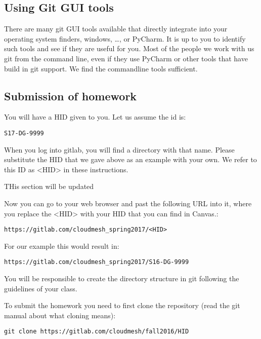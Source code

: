\subsection{Using Git GUI tools}\label{using-git-gui-tools}

There are many git GUI tools available that directly integrate into your
operating system finders, windows, \ldots{}, or PyCharm. It is up to you
to identify such tools and see if they are useful for you. Most of the
people we work with us git from the command line, even if they use
PyCharm or other tools that have build in git support. We find the
commandline tools sufficient.

\subsection{Submission of homework}\label{submission-of-homework}

You will have a HID given to you. Let us assume the id is:

\begin{verbatim}
S17-DG-9999
\end{verbatim}

When you log into gitlab, you will find a directory with that name.
Please substitute the HID that we gave above as an example with your
own. We refer to this ID as \textless{}HID\textgreater{} in these
instructions.

THis section will be updated

Now you can go to your web browser and past the following URL into it,
where you replace the \textless{}HID\textgreater{} with your HID that
you can find in Canvas.:

\begin{verbatim}
https://gitlab.com/cloudmesh_spring2017/<HID>
\end{verbatim}

For our example this would result in:

\begin{verbatim}
https://gitlab.com/cloudmesh_spring2017/S16-DG-9999
\end{verbatim}

You will be responsible to create the directory structure in git
following the guidelines of your class.

To submit the homework you need to first clone the repository (read the
git manual about what cloning means):

\begin{verbatim}
git clone https://gitlab.com/cloudmesh/fall2016/HID
\end{verbatim}

